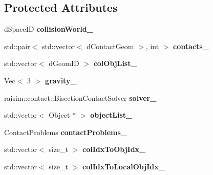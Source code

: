 \subsection*{Protected Attributes}
\begin{DoxyCompactItemize}
\item 
\mbox{\label{classraisim_1_1World_a34d0ceb8bd1d4d62910385e4e7f00bad}} 
d\+Space\+ID {\bfseries collision\+World\+\_\+}
\item 
\mbox{\label{classraisim_1_1World_a67d00901bd1142e08b55a714122d2ca6}} 
std\+::pair$<$ std\+::vector$<$ d\+Contact\+Geom $>$, int $>$ {\bfseries contacts\+\_\+}
\item 
\mbox{\label{classraisim_1_1World_a786f86f69d018bbce3592145b98d0ac5}} 
std\+::vector$<$ d\+Geom\+ID $>$ {\bfseries col\+Obj\+List\+\_\+}
\item 
\mbox{\label{classraisim_1_1World_a2845e72e8194c159e65958f4e2e4e6f8}} 
Vec$<$ 3 $>$ {\bfseries gravity\+\_\+}
\item 
\mbox{\label{classraisim_1_1World_a5af97cf9f99aed56f8e8dc84884f52c7}} 
raisim\+::contact\+::\+Bisection\+Contact\+Solver {\bfseries solver\+\_\+}
\item 
\mbox{\label{classraisim_1_1World_a2180d35285d3d7505b0dba24a0a3bf34}} 
std\+::vector$<$ Object $\ast$ $>$ {\bfseries object\+List\+\_\+}
\item 
\mbox{\label{classraisim_1_1World_a4dd8dfa71510245e97d5c8fec5589d99}} 
Contact\+Problems {\bfseries contact\+Problems\+\_\+}
\item 
\mbox{\label{classraisim_1_1World_aa8ebad2abc444253489ce244171698d0}} 
std\+::vector$<$ size\+\_\+t $>$ {\bfseries col\+Idx\+To\+Obj\+Idx\+\_\+}
\item 
\mbox{\label{classraisim_1_1World_aa811304642c39b3e9e91672213b8fa93}} 
std\+::vector$<$ size\+\_\+t $>$ {\bfseries col\+Idx\+To\+Local\+Obj\+Idx\+\_\+}
\item 
\mbox{\label{classraisim_1_1World_a38af88230424fe5ae29f76e42b2a94ac}} 

\end{DoxyCompactItemize}
